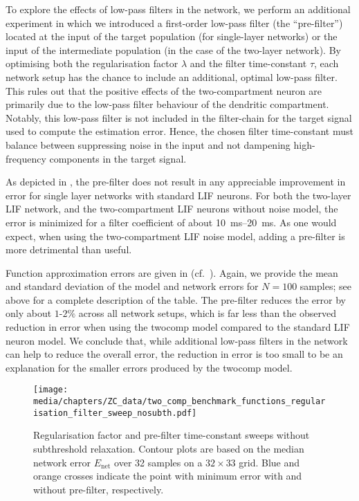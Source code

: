 To explore the effects of low-pass filters in the network, we perform an additional experiment in which we introduced a first-order low-pass filter (the \enquote{pre-filter}) located at the input of the target population (for single-layer networks) or the input of the intermediate population (in the case of the two-layer network).
By optimising both the regularisation factor $\lambda$ and the filter time-constant $\tau$, each network setup has the chance to include an additional, optimal low-pass filter.
This rules out that the positive effects of the two-compartment neuron are primarily due to the low-pass filter behaviour of the dendritic compartment.
Notably, this low-pass filter is not included in the filter-chain for the target signal used to compute the estimation error.
Hence, the chosen filter time-constant must balance between suppressing noise in the input and not dampening high-frequency components in the target signal.

As depicted in , the pre-filter does not result in any appreciable improvement in error for single layer networks with standard LIF neurons.
For both the two-layer LIF network, and the two-compartment LIF neurons without noise model, the error is minimized for a filter coefficient of about \SIrange{10}{20}{\milli\second}.
As one would expect, when using the two-compartment LIF noise model, adding a pre-filter is more detrimental than useful.

Function approximation errors are given in (cf.~).
Again, we provide the mean and standard deviation of the model and network errors for $N = 100$ samples; see above for a complete description of the table.
The pre-filter reduces the error by only about $1$-$2\%$ across all network setups, which is far less than the observed reduction in error when using the \gls{twocomp} model compared to the standard LIF neuron model.
We conclude that, while additional low-pass filters in the network can help to reduce the overall error, the reduction in error is too small to be an explanation for the smaller errors produced by the \gls{twocomp} model.

\begin{figure}[p]
	\texttt{[image: media/chapters/ZC\_data/two\_comp\_benchmark\_functions\_regularisation\_filter\_sweep\_nosubth.pdf]}
	\caption[Regularisation factor and pre-filter time-constant sweeps without subthreshold relaxation]{Regularisation factor and pre-filter time-constant sweeps without subthreshold relaxation. Contour plots are based on the median network error $E_\mathrm{net}$ over 32 samples on a $32 \times 33$ grid. Blue and orange crosses indicate the point with minimum error with and without pre-filter, respectively.}
	\label{fig:regularization_parameter_sweep_nosubth}
\end{figure}

